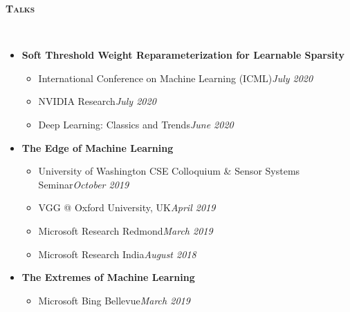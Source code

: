 \documentclass[10pt]{article}
\renewcommand{\section}[1]{
\bigskip
  \begin{Large}
  {\textsc{\textbf{#1}}}
  \end{Large}
  \hrulefill
  \medskip
  \\
}
\newenvironment{lonemidlist}[1][\enskip\textbullet]%
        {\begin{itemize}[#1,leftmargin=*,parsep=0pt,itemsep=4pt,topsep=0pt,partopsep=0pt]}
        {\end{itemize}\vspace{-.6\baselineskip}}
\begin{document}
\section{Talks}
\vspace{-3mm}
\begin{lonemidlist}
\item\textbf{Soft Threshold Weight Reparameterization for Learnable Sparsity}
\begin{itemize}
    \item International Conference on Machine Learning (ICML)\hfill{\textit{July 2020}}
    \item NVIDIA Research\hfill{\textit{July 2020}} 
    \item Deep Learning: Classics and Trends\hfill{\textit{June 2020}}
\end{itemize}
\item\textbf{The Edge of Machine Learning}
\begin{itemize}
     \item University of Washington CSE Colloquium \&  Sensor Systems Seminar\hfill{\textit{October 2019}}
     \item VGG @ Oxford University, UK\hfill{\textit{April 2019}}
     \item Microsoft Research Redmond\hfill{\textit{March 2019}}
     \item Microsoft Research India\hfill{\textit{August 2018}}
\end{itemize}
\item\textbf{The Extremes of Machine Learning}
\begin{itemize}
     \item Microsoft Bing Bellevue\hfill{\textit{March 2019}}
\end{itemize}
\end{lonemidlist}
\end{document}
